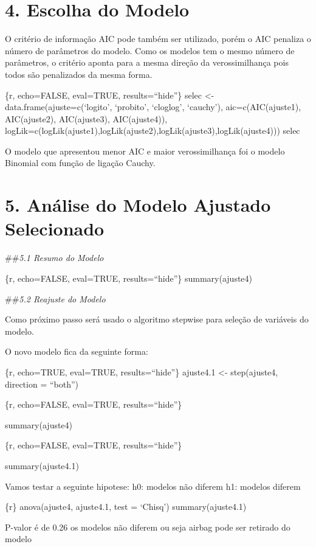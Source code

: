 \documentclass[]{article}
\begin{document}
\hypertarget{escolha-do-modelo}{%
\section{4. Escolha do Modelo}\label{escolha-do-modelo}}

O critério de informação AIC pode também ser utilizado, porém o AIC
penaliza o número de parâmetros do modelo. Como os modelos tem o mesmo
número de parâmetros, o critério aponta para a mesma direção da
verossimilhança pois todos são penalizados da mesma forma.

\{r, echo=FALSE, eval=TRUE, results=``hide''\} selec \textless{}-
data.frame(ajuste=c(`logito', `probito', `cloglog', `cauchy'),
aic=c(AIC(ajuste1), AIC(ajuste2), AIC(ajuste3), AIC(ajuste4)),
logLik=c(logLik(ajuste1),logLik(ajuste2),logLik(ajuste3),logLik(ajuste4)))
selec

O modelo que apresentou menor AIC e maior verossimilhança foi o modelo
Binomial com função de ligação Cauchy.

\hypertarget{analise-do-modelo-ajustado-selecionado}{%
\section{5. Análise do Modelo Ajustado
Selecionado}\label{analise-do-modelo-ajustado-selecionado}}

\#\#\emph{5.1 Resumo do Modelo}

\{r, echo=FALSE, eval=TRUE, results=``hide''\} summary(ajuste4)

\#\#\emph{5.2 Reajuste do Modelo}

Como próximo passo será usado o algoritmo stepwise para seleção de
variáveis do modelo.

O novo modelo fica da seguinte forma:

\{r, echo=TRUE, eval=TRUE, results=``hide''\} ajuste4.1 \textless{}-
step(ajuste4, direction = ``both'')

\{r, echo=FALSE, eval=TRUE, results=``hide''\}

summary(ajuste4)

\{r, echo=FALSE, eval=TRUE, results=``hide''\}

summary(ajuste4.1)

Vamos testar a seguinte hipotese: h0: modelos não diferem h1: modelos
diferem

\{r\} anova(ajuste4, ajuste4.1, test = `Chisq') summary(ajuste4.1)

P-valor é de 0.26 os modelos não diferem ou seja airbag pode ser
retirado do modelo
\end{document}
